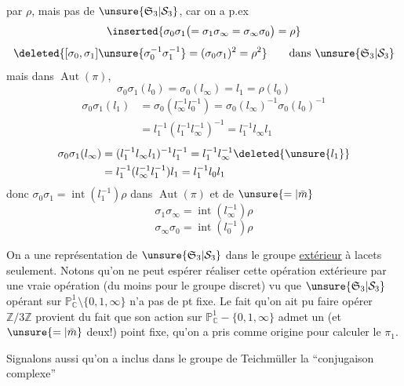 par $\rho$, mais pas de $\unsure{\mathfrak S_3|\mathcal S_3}$, car on a p.ex
\[
\inserted{\sigma_0\sigma_1\bigl(=\sigma_1\sigma_\infty=\sigma_\infty\sigma_0\bigr)=\rho}
\]
\[
\deleted{[\sigma_0,\sigma_1]\unsure{\sigma_0^{-1}\sigma_1^{-1}}=(\sigma_0\sigma_1)^2=\rho^2}\qquad\text{dans }\unsure{\mathfrak S_3|\mathcal S_3}
\]
mais dans $\operatorname{Aut}(\pi)$, 
\[
\sigma_0\sigma_1(l_0)=\sigma_0(l_\infty)=l_1=\rho(l_0)
\]
\[
\begin{aligned}
\sigma_0\sigma_1(l_1)&=\sigma_0(l_\infty^{-1}l_0^{-1})=\sigma_0(l_\infty)^{-1}\sigma_0(l_0)^{-1}\\
&=l_1^{-1}(l_1^{-1}l_\infty^{-1})^{-1}=l_1^{-1}l_\infty l_1
\end{aligned}
\]
\[
\begin{aligned}
\sigma_0\sigma_1(l_\infty)&=(l_1^{-1}l_\infty l_1)^{-1}l_1^{-1}=l_1^{-1}l_\infty^{-1}\deleted{\unsure{l_1}}\\
&=l_1^{-1}(l_\infty^{-1}l_1^{-1})l_1=l_1^{-1}l_0l_1
\end{aligned}
\]
donc $\sigma_0\sigma_1=\operatorname{int}(l_1^{-1})\rho$ dans $\operatorname{Aut}(\pi)$ et de $\unsure{=|\bar m}$
\[
\sigma_1\sigma_\infty=\operatorname{int}(l_\infty^{-1})\rho
\]
\[
\sigma_\infty\sigma_0=\operatorname{int}(l_0^{-1})\rho
\]

On a une représentation de $\unsure{\mathfrak S_3|\mathcal S_3}$ dans le groupe \uline{extérieur} à lacets seulement. Notons qu'on ne peut espérer réaliser cette opération extérieure par une vraie opération (du moins pour le groupe discret) vu que $\unsure{\mathfrak S_3|\mathcal S_3}$ opérant sur $\mathbb P^1_{\mathbb C}\setminus\{0,1,\infty\}$ n'a pas de pt fixe. Le fait qu'on ait pu faire opérer $\mathbb Z/3\mathbb Z$  provient du fait que son action sur $\mathbb P^1_{\mathbb C}-\{0,1,\infty\}$ admet un (et $\unsure{=|\bar m}$ deux!) point fixe,  qu'on  a pris comme origine pour calculer le $\pi_1$.

Signalons aussi qu'on a inclus dans le groupe de Teichmüller  la ``conjugaison complexe''
